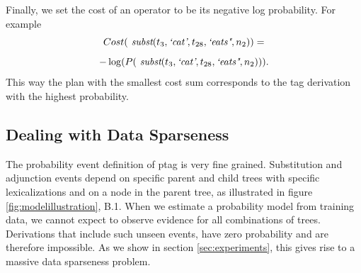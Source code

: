 Finally, we set the cost of an operator to be its negative log probability. For example 
\[
Cost( \textit{ subst}(t_3,\textit{`cat'},t_{28},\textit{`eats"},n_2) ) =
\]
\[ 
 -\log( P(\textit{ subst}(t_3,\textit{`cat'},t_{28},\textit{`eats"},n_2)) ). 
\] 
This way the plan with the smallest cost sum corresponds to the {\sc tag} derivation with the highest probability. 

\subsection{Dealing with Data Sparseness}
\label{ssec:sparseness}
The probability event definition of {\sc ptag} is very fine grained. Substitution and adjunction events depend on specific parent and child trees with specific lexicalizations and on a node in the parent tree, as illustrated in figure \ref{fig:modelillustration}, B.1. When we estimate a probability model from training data, we cannot expect to observe evidence for all combinations of trees. Derivations that include such unseen events, have zero probability and are therefore impossible. As we show in section \ref{sec:experiments}, this gives rise to a massive data sparseness problem.

